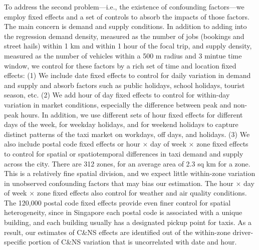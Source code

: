 \documentclass[reviewmode]{restud}
\begin{document}
To address the second problem---i.e., the existence of confounding factors---we employ fixed effects and a set of controls to absorb the impacts of those factors. The main concern is  demand and supply conditions. In addition to adding  into the regression demand density, measured as the number of jobs (bookings and street hails) within 1 km and within 1 hour of the focal trip, and supply density, measured as the number of vehicles within a 500 m radius and 3 mintue time window, we control for these factors by a rich set of time and location fixed effects: (1) We include date fixed effects to control for daily variation in demand and supply and absorb factors such as public holidays, school holidays, tourist season, etc. (2) We add hour of day fixed effects to control for within-day variation in market conditions, especially the difference between peak and non-peak hours. In addition, we use different sets of hour fixed effects for different days of the week, for weekday holidays, and for weekend holidays to capture distinct patterns of the taxi market on workdays, off days, and holidays. (3)  We also include postal code fixed effects or hour $\times$ day of week $\times$ zone fixed effects to control for spatial or spatiotemporal differences in taxi demand and supply across the city. There are 312 zones, for an average area of 2.3 sq km for a zone. This is a relatively fine spatial division, and we expect little within-zone variation in unobserved confounding factors that may bias our estimation. The  hour $\times$ day of week $\times$ zone fixed effects also control for weather and air quality conditions. The 120,000 postal code fixed effects provide even finer control for spatial heterogeneity, since in Singapore each postal code is associated with a unique building, and each building usually has a designated pickup point for taxis. As a result, our estimates of C\&NS effects are identified out of the within-zone driver-specific portion of C\&NS variation that is uncorrelated with date and hour. %
\end{document}
